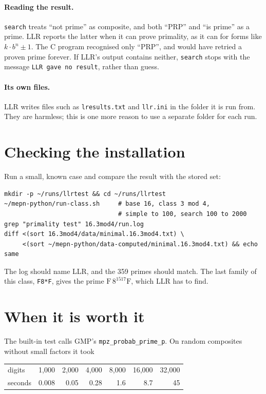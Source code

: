 \documentclass[11pt]{article}
\newcommand{\code}[1]{\texttt{#1}}
\begin{document}
\paragraph{Reading the result.} \code{search} treats ``not prime'' as composite, and both ``PRP'' and ``is prime'' as a prime. LLR reports the latter when it can prove primality, as it can for forms like $k\cdot b^n\pm1$. The C program recognised only ``PRP'', and would have retried a proven prime forever. If LLR's output contains neither, \code{search} stops with the message \code{LLR gave no result}, rather than guess.

\paragraph{Its own files.} LLR writes files such as \code{lresults.txt} and \code{llr.ini} in the folder it is run from. They are harmless; this is one more reason to use a separate folder for each run.

\section{Checking the installation}

Run a small, known case and compare the result with the stored set:
\begin{Verbatim}
mkdir -p ~/runs/llrtest && cd ~/runs/llrtest
~/mepn-python/run-class.sh     # base 16, class 3 mod 4,
                               # simple to 100, search 100 to 2000
grep "primality test" 16.3mod4/run.log
diff <(sort 16.3mod4/data/minimal.16.3mod4.txt) \
     <(sort ~/mepn-python/data-computed/minimal.16.3mod4.txt) && echo same
\end{Verbatim}
The log should name LLR, and the 359 primes should match. The last family of this class, \code{F8*F}, gives the prime $\mathrm{F}\,8^{1517}\mathrm{F}$, which LLR has to find.

\section{When it is worth it}

The built-in test calls GMP's \code{mpz\_probab\_prime\_p}. On random composites without small factors it took

\begin{center}
\begin{tabular}{@{}lrrrrrr@{}}
\toprule
digits & 1{,}000 & 2{,}000 & 4{,}000 & 8{,}000 & 16{,}000 & 32{,}000\\
seconds & 0.008 & 0.05 & 0.28 & 1.6 & 8.7 & 45\\
\bottomrule
\end{tabular}
\end{center}
\end{document}
